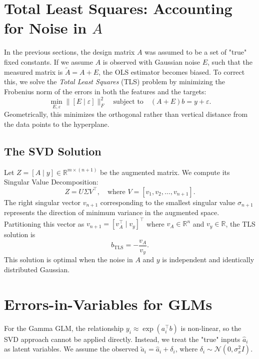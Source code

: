 \documentclass{article}
\begin{document}
\section{Total Least Squares: Accounting for Noise in $A$}
In the previous sections, the design matrix $A$ was assumed to be a set of "true" fixed constants. If we assume $A$ is observed with Gaussian noise $E$, such that the measured matrix is $\tilde{A} = A + E$, the OLS estimator becomes biased. To correct this, we solve the \emph{Total Least Squares} (TLS) problem by minimizing the Frobenius norm of the errors in both the features and the targets:
\[
    \min_{E, \varepsilon} \| [E \mid \varepsilon] \|_F^2 \quad \text{subject to} \quad (A+E)b = y + \varepsilon.
\]
Geometrically, this minimizes the orthogonal rather than vertical distance from the data points to the hyperplane.

\subsection{The SVD Solution}
Let $Z = [A \mid y] \in \mathbb{R}^{m \times (n+1)}$ be the augmented matrix. We compute its Singular Value Decomposition:
\[
    Z = U \Sigma V^\top, \quad \text{where } V = [v_1, v_2, \dots, v_{n+1}].
\]
The right singular vector $v_{n+1}$ corresponding to the smallest singular value $\sigma_{n+1}$ represents the direction of minimum variance in the augmented space. Partitioning this vector as $v_{n+1} = [v_A^\top \mid v_y]^\top$ where $v_A \in \mathbb{R}^n$ and $v_y \in \mathbb{R}$, the TLS solution is
\[
    b_{\text{TLS}} = -\frac{v_A}{v_y}.
\]
This solution is optimal when the noise in $A$ and $y$ is independent and identically distributed Gaussian.

\section{Errors-in-Variables for GLMs}
For the Gamma GLM, the relationship $y_i \approx \exp(a_i^\top b)$ is non-linear, so the SVD approach cannot be applied directly. Instead, we treat the "true" inputs $\hat{a}_i$ as latent variables. We assume the observed $\tilde{a}_i = \hat{a}_i + \delta_i$, where $\delta_i \sim \mathcal{N}(0, \sigma_x^2 I)$.
\end{document}
